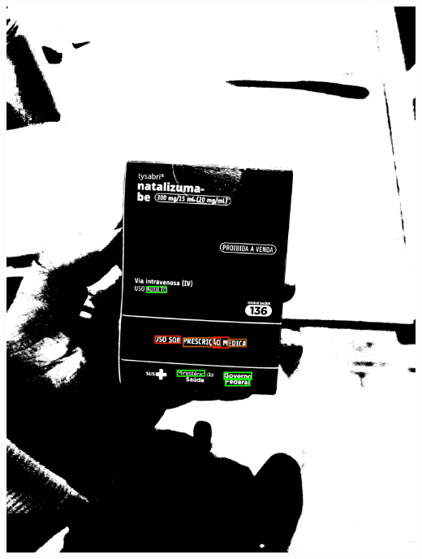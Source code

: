 \begin{frame}
\begin{columns}
\begin{column}{0.24\textwidth}
			\includegraphics[height=0.35\textheight]{../pictures/tysabri_rgb_b_only_thresh_boxes.jpg}
		\end{column}
	\end{columns}
\end{frame}

